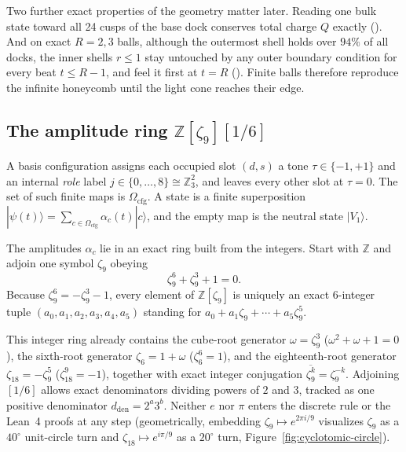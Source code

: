 Two further exact properties of the geometry matter later. Reading one bulk state toward all 24 cusps of the base dock
conserves total charge $Q$ exactly (). And on exact $R = 2, 3$ balls, although the outermost shell
holds over $94\%$ of all docks, the inner shells $r \le 1$ stay untouched by any outer boundary condition for every
beat $t \le R - 1$, and feel it first at $t = R$ (). Finite balls therefore reproduce the infinite
honeycomb until the light cone reaches their edge.

\subsection{The amplitude ring \texorpdfstring{$\mathbb{Z}[\zeta_9][1/6]$}{Z[zeta\_9][1/6]}}

A basis configuration assigns each occupied slot
$(d, s)$ a tone $\tau \in \{-1, +1\}$ and an internal \emph{role} label $j \in \{0, \ldots, 8\} \cong \mathbb{Z}_3^2$,
and leaves every other slot at $\tau = 0$. The set of such finite maps is $\Omega_{\mathrm{cfg}}$. A state is a finite
superposition $|\psi(t)\rangle = \sum_{c \in \Omega_{\mathrm{cfg}}} \alpha_c(t) |c\rangle$, and the empty map is the
neutral state $|V_1\rangle$.

The amplitudes $\alpha_c$ lie in an exact ring built from the integers. Start with $\mathbb{Z}$ and
adjoin one symbol $\zeta_9$ obeying
\begin{equation}
\zeta_9^6 + \zeta_9^3 + 1 = 0.
\label{eq:z9-poly}
\end{equation}
Because $\zeta_9^6 = -\zeta_9^3 - 1$, every element of $\mathbb{Z}[\zeta_9]$ is uniquely an exact 6-integer tuple
$(a_0,\allowbreak a_1,\allowbreak a_2,\allowbreak a_3,\allowbreak a_4,\allowbreak a_5)$ standing for
$a_0 + a_1 \zeta_9 + \cdots + a_5 \zeta_9^5$.

This integer ring already contains the cube-root generator $\omega = \zeta_9^3$ ($\omega^2 + \omega + 1 = 0$), the
sixth-root generator $\zeta_6 = 1 + \omega$ ($\zeta_6^6 = 1$), and the eighteenth-root generator
$\zeta_{18} = -\zeta_9^5$ ($\zeta_{18}^9 = -1$), together with exact integer conjugation
$\overline{\zeta_9^k} = \zeta_9^{-k}$. Adjoining $[1/6]$ allows exact denominators dividing powers of $2$ and $3$,
tracked as one positive  denominator $d_{\mathrm{den}} = 2^a 3^b$. Neither $e$ nor $\pi$ enters the
discrete rule or the Lean~4 proofs at any step (geometrically, embedding $\zeta_9 \mapsto e^{2\pi i/9}$ visualizes
$\zeta_9$ as a $40^\circ$ unit-circle turn and $\zeta_{18} \mapsto e^{i\pi/9}$ as a $20^\circ$ turn,
Figure~\ref{fig:cyclotomic-circle}).

